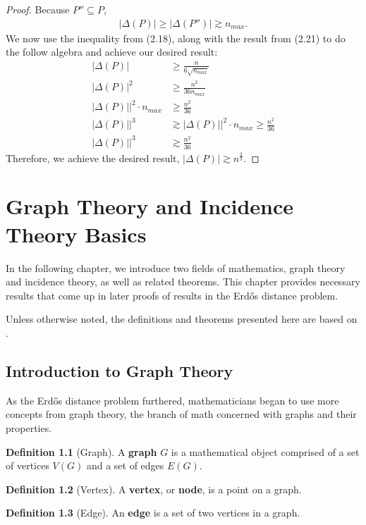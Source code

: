 \documentclass{scrippsthesisclass}
\theoremstyle{definition}
\newtheorem{defn}{Definition}[section]
\begin{document}
\begin{proof}
    Because $P'' \subseteq P$,
    \begin{align}
    \left| \Delta(P) \right| \geq \left| \Delta(P'') \right| \gtrsim n_{max}.
    \end{align}
    We now use the inequality from (2.18), along with the result from (2.21) to do the follow algebra and achieve our desired result:
    \begin{align*}
        \left|\Delta(P)\right| &\geq \frac{n}{6\sqrt{n_{max}}}\\
        \left|\Delta(P)\right|^2 &\geq \frac{n^2}{36n_{max}}\\
        \left|\Delta(P)|\right|^2 \cdot n_{max} &\geq \frac{n^2}{36}\\
        \left|\Delta(P)|\right|^3 &\gtrsim \left|\Delta(P)|\right|^2 \cdot n_{max} \geq \frac{n^2}{36}\\
        \left|\Delta(P)|\right|^3 &\gtrsim \frac{n^2}{36}
    \end{align*}
    Therefore, we achieve the desired result, $\left|\Delta(P)\right| \gtrsim n^{\frac{2}{3}}$. 
    \end{proof}

\chapter{Graph Theory and Incidence Theory Basics}
In the following chapter, we introduce two fields of mathematics, graph theory and incidence theory, as well as related theorems. 
This chapter provides necessary results that come up in later proofs of results in the Erd\H{o}s distance problem. 

Unless otherwise noted, the definitions and theorems presented here are based on \cite{thebook}.
\section{Introduction to Graph Theory}
As the Erd\H{o}s distance problem furthered, mathematicians began to use more concepts from graph theory, the branch of math concerned with graphs and their properties. 
\begin{defn}[Graph]
    A \textbf{graph} $G$ is a mathematical object comprised of a set of vertices $V(G)$ and a set of edges $E(G)$.
\end{defn}
\begin{defn}[Vertex]
    A \textbf{vertex}, or \textbf{node}, is a point on a graph.
\end{defn}
\begin{defn}[Edge]
    An \textbf{edge} is a set of two vertices in a graph. 
\end{defn}
\end{document}
